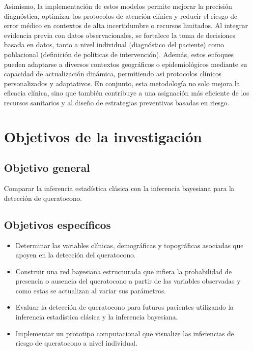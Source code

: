 Asimismo, la implementación de estos modelos permite mejorar la precisión diagnóstica, optimizar los protocolos de atención clínica y reducir el riesgo de error médico en contextos de alta incertidumbre o recursos limitados. Al integrar evidencia previa con datos observacionales, se fortalece la toma de decisiones basada en datos, tanto a nivel individual (diagnóstico del paciente) como poblacional (definición de políticas de intervención). Además, estos enfoques pueden adaptarse a diversos contextos geográficos o epidemiológicos mediante su capacidad de actualización dinámica, permitiendo así protocolos clínicos personalizados y adaptativos. En conjunto, esta metodología no solo mejora la eficacia clínica, sino que también contribuye a una asignación más eficiente de los recursos sanitarios y al diseño de estrategias preventivas basadas en riesgo.

\section{Objetivos de la investigación}
\subsection{Objetivo general}
Comparar la inferencia estadística clásica con la inferencia bayesiana para la detección de queratocono.
\subsection{Objetivos específicos}
\begin{itemize}
	\item Determinar las variables clínicas, demográficas y topográficas asociadas que apoyen en la detección del queratocono.
	\item Construir una red bayesiana estructurada que infiera la probabilidad de presencia o ausencia del queratocono a partir de las variables observadas y como estas se actualizan al variar sus parámetros.
	\item Evaluar la detección de queratocono para futuros pacientes utilizando la inferencia estadística clásica y la inferencia bayesiana.
	\item Implementar un prototipo computacional que visualize las inferencias de riesgo de queratocono a nivel individual.
\end{itemize}
